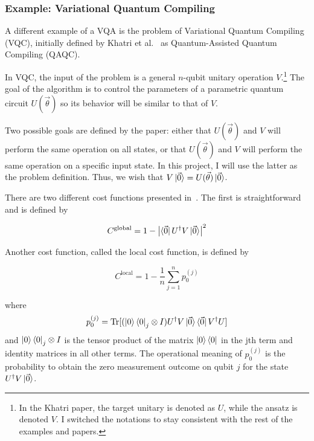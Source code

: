 \documentclass[a4paper,12pt]{article}
\newcommand{\thetas}{\vec{\theta}}
\DeclareMathOperator{\tr}{Tr}
\begin{document}
\subsubsection{Example: Variational Quantum Compiling} \label{subsec:vqc}
A different example of a VQA is the problem of Variational Quantum Compiling (VQC), initially defined by Khatri et al.~\cite{khatri_quantum-assisted_2019} as Quantum-Assisted Quantum Compiling (QAQC).

In VQC, the input of the problem is a general $n$-qubit unitary operation $V$.\footnote{In the Khatri paper, the target unitary is denoted as $U$, while the ansatz is denoted $V$. I switched the notations to stay consistent with the rest of the examples and papers.} The goal of the algorithm is to control the parameters of a parametric quantum circuit $U(\thetas)$ so its behavior will be similar to that of $V$.

Two possible goals are defined by the paper: either that $U(\thetas)$ and $V$ will perform the same operation on all states, or that $U(\thetas)$ and $V$ will perform the same operation on a specific input state.
In this project, I will use the latter as the problem definition. Thus, we wish that $V\ket{\vec{0}} = U(\thetas)\ket{\vec{0}}$.

There are two different cost functions presented in~\cite{khatri_quantum-assisted_2019}.
The first is straightforward and is defined by

\begin{equation}
    C^{\textrm{global}} = 1 - \left|\bra{\vec{0}}U^\dagger V\ket{\vec{0}}\right|^2
\end{equation}

Another cost function, called the local cost function, is defined by 

\begin{equation}
    C^{\textrm{local}} = 1 - \frac{1}{n} \sum_{j=1}^{n} p_0^{(j)}
\end{equation}

where
\begin{equation} \label{eqn:local_vqc_cost}
    p_0^{(j)} = \tr[({\ket{0}\bra{0}}_j \otimes I) U^\dagger V \ket{\vec{0}}\bra{\vec{0}} V^\dagger U]
\end{equation}
and ${\ket{0}\bra{0}}_j \otimes I$ is the tensor product of the matrix $\ket{0}\bra{0}$ in the jth term and identity matrices in all other terms.
The operational meaning of $p_0^{(j)}$ is the probability to obtain the zero measurement outcome on qubit $j$ for the state $U^\dagger V\ket{\vec{0}}$.
\end{document}
